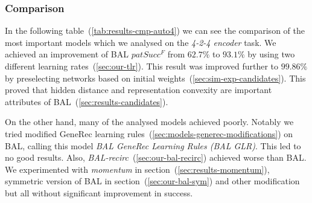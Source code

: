 
\subsubsection{Comparison} 
\label{sec:tlr-auto4-cmp} 

In the following table~(\ref{tab:results-cmp-auto4}) we can see the comparison of the most important models which we analysed on the \emph{4-2-4 encoder} task. We achieved an improvement of BAL $patSucc^F$ from $62.7\%$ to $93.1\%$ by using two different learning rates~(\ref{sec:our-tlr}). This result was improved further to $99.86\%$ by preselecting networks based on initial weights~(\ref{sec:sim-exp-candidates}). This proved that hidden distance and representation convexity are important attributes of BAL~(\ref{sec:results-candidates}). 

On the other hand, many of the analysed models achieved poorly. Notably we tried modified GeneRec learning rules~(\ref{sec:models-generec-modifications}) on BAL, calling this model \emph{BAL GeneRec Learning Rules (BAL GLR)}. This led to no good results. Also, \emph{BAL-recirc}~(\ref{sec:our-bal-recirc}) achieved worse than BAL. We experimented with \emph{momentum} in section~(\ref{sec:results-momentum}), symmetric version of BAL in section~(\ref{sec:our-bal-sym}) and other modification but all without significant improvement in success. 

